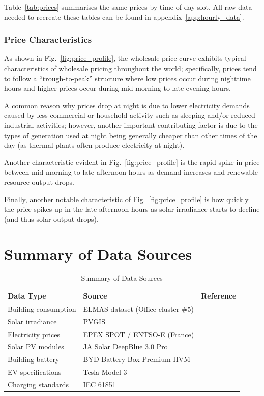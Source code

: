 Table~\ref{tab:prices} summarises the same prices by time-of-day slot. All raw data needed to recreate these tables can be found in appendix~\ref{app:hourly_data}.

\subsubsection{Price Characteristics}

As shown in Fig.\ \ref{fig:price_profile}, the wholesale price curve exhibits typical characteristics of wholesale pricing throughout the world; specifically, prices tend to follow a ``trough-to-peak'' structure where low prices occur during nighttime hours and higher prices occur during mid-morning to late-evening hours.

A common reason why prices drop at night is due to lower electricity demands caused by less commercial or household activity such as sleeping and/or reduced industrial activities; however, another important contributing factor is due to the types of generation used at night being generally cheaper than other times of the day (as thermal plants often produce electricity at night).

Another characteristic evident in Fig.\ \ref{fig:price_profile} is the rapid spike in price between mid-morning to late-afternoon hours as demand increases and renewable resource output drops.

Finally, another notable characteristic of Fig.\ \ref{fig:price_profile} is how quickly the price spikes up in the late afternoon hours as solar irradiance starts to decline (and thus solar output drops).

\section{Summary of Data Sources}
\label{sec:data_sources}

\begin{table}[h]
\centering
\caption{Summary of Data Sources}
\label{tab:data_sources}
\begin{tabular}{@{}lll@{}}
\toprule
\textbf{Data Type} & \textbf{Source} & \textbf{Reference} \\
\midrule
Building consumption & ELMAS dataset (Office cluster \#5) & \cite{elmas} \\
Solar irradiance & PVGIS & \cite{pvgis} \\
Electricity prices & EPEX SPOT / ENTSO-E (France) & \cite{entsoe_transparency,epex_spot} \\
Solar PV modules & JA Solar DeepBlue 3.0 Pro & \cite{ja_solar_deepblue} \\
Building battery & BYD Battery-Box Premium HVM & \cite{byd_batterybox} \\
EV specifications & Tesla Model 3 & \cite{tesla_specs} \\
Charging standards & IEC 61851 & \cite{iec61851} \\
\bottomrule
\end{tabular}
\end{table}

